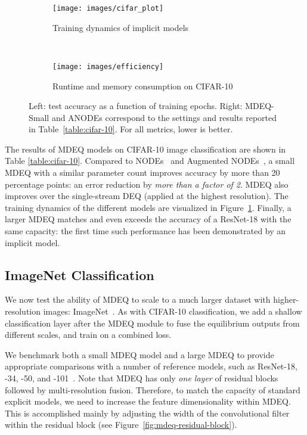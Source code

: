 \documentclass{article}
\begin{document}
\begin{figure}[t]
    \vspace{-.1in}
    \centering
    \begin{subfigure}[b]{0.47\textwidth}
    \texttt{[image: images/cifar\_plot]}
    \caption{Training dynamics of implicit models}
    \label{fig:cifar-10}
    \end{subfigure}
    ~
    \begin{subfigure}[b]{0.51\textwidth}
    \texttt{[image: images/efficiency]}
    \caption{Runtime and memory consumption on CIFAR-10}
    \label{fig:efficiency}
    \end{subfigure}
    \vspace{-.2in}
    \caption{Left: test accuracy as a function of training epochs. Right: MDEQ-Small and ANODEs correspond to the settings and results reported in Table~\ref{table:cifar-10}. For all metrics, lower is better.}
\vspace{-.15in}
\end{figure}

The results of MDEQ models on CIFAR-10 image classification are shown in Table \ref{table:cifar-10}. Compared to NODEs~\cite{chen2018neural} and Augmented NODEs~\cite{dupont2019augmented}, a small MDEQ with a similar parameter count improves accuracy by more than 20 percentage points: an error reduction by \emph{more than a factor of 2}. MDEQ also improves over the single-stream DEQ (applied at the highest resolution). The training dynamics of the different models are visualized in Figure~\ref{fig:cifar-10}. Finally, a larger MDEQ matches and even exceeds the accuracy of a ResNet-18 with the same capacity: the first time such performance has been demonstrated by an implicit model.

\subsection{ImageNet Classification}

We now test the ability of MDEQ to scale to a much larger dataset with higher-resolution images: ImageNet~\cite{deng2009imagenet}. As with CIFAR-10 classification, we add a shallow classification layer after the MDEQ module to fuse the equilibrium outputs from different scales, and train on a combined loss.

We benchmark both a small MDEQ model and a large MDEQ to provide appropriate comparisons with a number of reference models, such as ResNet-18, -34, -50, and -101~\cite{he2016deep}. Note that MDEQ has only \emph{one layer} of residual blocks followed by multi-resolution fusion. Therefore, to match the capacity of standard explicit models, we need to increase the feature dimensionality within MDEQ. This is accomplished mainly by adjusting the width of the convolutional filter within the residual block (see Figure~\ref{fig:mdeq-residual-block}).
\end{document}
